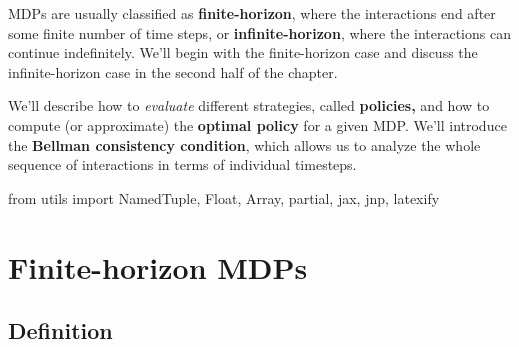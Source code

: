 \documentclass[
  letterpaper,
  DIV=11,
  numbers=noendperiod]{scrreprt}
\newenvironment{Shaded}{\begin{snugshade}}{\end{snugshade}}
\newcommand{\ImportTok}[1]{\textcolor[rgb]{0.00,0.46,0.62}{#1}}
\newcommand{\NormalTok}[1]{\textcolor[rgb]{0.00,0.23,0.31}{#1}}
\theoremstyle{plain}
\theoremstyle{plain}
\theoremstyle{definition}
\theoremstyle{definition}
\theoremstyle{remark}
\begin{document}
MDPs are usually classified as \textbf{finite-horizon}, where the
interactions end after some finite number of time steps, or
\textbf{infinite-horizon}, where the interactions can continue
indefinitely. We'll begin with the finite-horizon case and discuss the
infinite-horizon case in the second half of the chapter.

We'll describe how to \emph{evaluate} different strategies, called
\textbf{policies,} and how to compute (or approximate) the
\textbf{optimal policy} for a given MDP. We'll introduce the
\textbf{Bellman consistency condition}, which allows us to analyze the
whole sequence of interactions in terms of individual timesteps.

\begin{Shaded}
\begin{Highlighting}[]
\ImportTok{from}\NormalTok{ utils }\ImportTok{import}\NormalTok{ NamedTuple, Float, Array, partial, jax, jnp, latexify}
\end{Highlighting}
\end{Shaded}

\section{Finite-horizon MDPs}\label{finite-horizon-mdps}

\subsection{Definition}\label{definition}
\end{document}

